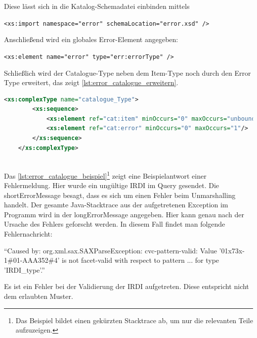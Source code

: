 Diese lässt sich in die Katalog-Schemadatei einbinden mittels

\lstinline[basicstyle=\ttfamily\small\mdseries]{<xs:import namespace="error" schemaLocation="error.xsd" /> }

Anschließend wird ein globales Error-Element angegeben:

\lstinline[basicstyle=\ttfamily\small\mdseries]{<xs:element name="error" type="err:errorType" />}

Schließlich wird der Catalogue-Type neben dem Item-Type noch durch den Error Type erweitert, das zeigt \autoref{lst:error_catalogue_erweitern}.

 \begin{lstlisting}[caption=Fehlerbehandlung - Catalogue Type erweitern, language=xml, label=lst:error_catalogue_erweitern]
	<xs:complexType name="catalogue_Type">
		<xs:sequence>
			<xs:element ref="cat:item" minOccurs="0" maxOccurs="unbounded"/>
			<xs:element ref="cat:error" minOccurs="0" maxOccurs="1"/>
		</xs:sequence>
	</xs:complexType> 
	
\end{lstlisting} 

Das \autoref{lst:error_catalogue_beispiel}\footnote{Das Beispiel bildet einen gekürzten Stacktrace ab, um nur die relevanten Teile aufzuzeigen.} zeigt eine Beispielantwort einer Fehlermeldung. Hier wurde ein ungültige IRDI im Query gesendet. Die shortErrorMessage besagt, dass es sich um einen Fehler beim Unmarshalling handelt. Der gesamte Java-Stacktrace aus der aufgetretenen Exception im Programm wird in der longErrorMessage angegeben. Hier kann genau nach der Ursache des Fehlers geforscht werden. In diesem Fall findet man folgende Fehlernachricht:

\enquote{Caused by: org.xml.sax.SAXParseException: cvc-pattern-valid: Value '01x73x-1\#01-AAA352\#4' is not facet-valid with respect to pattern ... for type 'IRDI\_type'.}

Es ist ein Fehler bei der Validierung der IRDI aufgetreten. Diese entspricht nicht dem erlaubten Muster.

